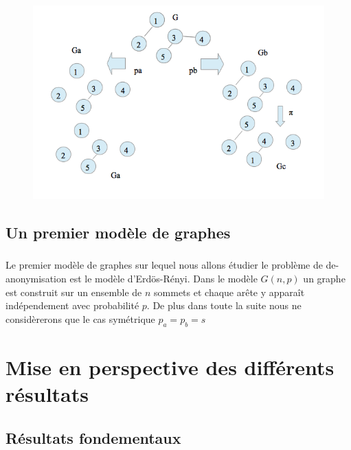 \documentclass[11pt]{beamer}
\begin{document}
\begin{frame}
\frametitle{\insertsubsection}


\begin{figure}[!h]
	\centering
	\includegraphics[scale=0.5]{01.png} \\
	\end{figure}	

\end{frame}

\subsection{Un premier modèle de graphes}

\begin{frame}
\frametitle{\insertsubsection}

Le premier modèle de graphes sur lequel nous allons étudier le problème de de-anonymisation est le modèle d'Erdös-Rényi. Dans le modèle $G(n,p)$ un graphe est construit sur un ensemble de $n$ sommets et chaque arête y apparaît indépendement avec probabilité $p$. De plus dans toute la suite nous ne considèrerons que le cas symétrique $p_a = p_b = s$

\end{frame}

\section{Mise en perspective des différents résultats}

\subsection{Résultats fondementaux}
\end{document}
